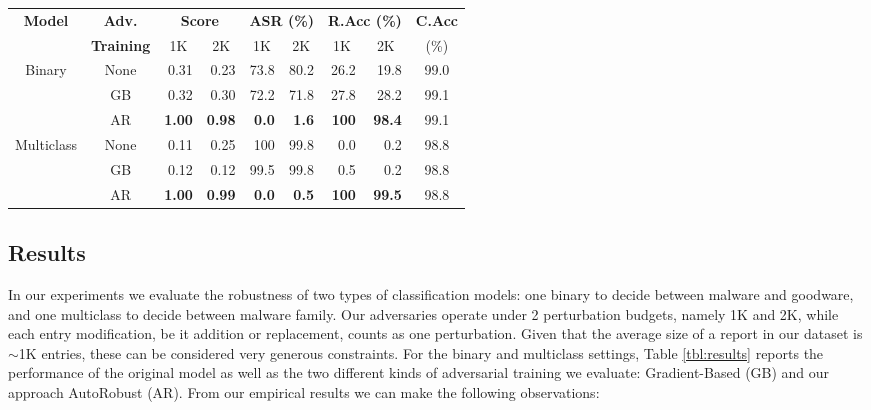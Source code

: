 \begin{table*}[!ht]
    \centering
    \caption{Performance of AutoRobust (AR), gradient-based (GB) adversarial training, and the original vanilla HMIL model considering the two perturbation budgets, 1K and 2K. The metrics displayed are: Score (of the origin class), Attack Success Rate (ASR), Clean Accuracy (C.Acc), and Robust Accuracy (R.Acc), all reported on the same hold-out test set.}
    \begin{tabular}{c|c|r|r|r|r|r|r|c}
    \toprule
    \multirow{2}{*}{\textbf{Model}} & \textbf{\small Adv.} & \multicolumn{2}{c|}{\textbf{Score}} & \multicolumn{2}{c|}{\textbf{ASR (\%)}} & \multicolumn{2}{c|}{\textbf{R.Acc (\%)}} & \textbf{C.Acc} \\
    & \textbf{\small Training} & \multicolumn{1}{c}{1K} & \multicolumn{1}{c|}{2K} & \multicolumn{1}{c}{1K} & \multicolumn{1}{c|}{2K} & \multicolumn{1}{c}{1K} & \multicolumn{1}{c|}{2K} & (\%)\\
    \midrule
    \multirow{3}{*}{Binary} & None & 0.31 & 0.23 & 73.8 & 80.2 & 26.2 & 19.8 & 99.0 \\
    & GB & 0.32 & 0.30 & 72.2 & 71.8 & 27.8 & 28.2 & 99.1 \\
    & AR & \textbf{1.00} & \textbf{0.98} & \textbf{0.0} & \textbf{1.6} & \textbf{100} & \textbf{98.4} & 99.1 \\
    \midrule
    \multirow{3}{*}{Multiclass} & None & 0.11 & 0.25 & 100 & 99.8 & 0.0 & 0.2 & 98.8 \\
    & GB & 0.12 & 0.12 & 99.5 & 99.8 & 0.5 & 0.2 & 98.8 \\
    & AR & \textbf{1.00} & \textbf{0.99} & \textbf{0.0} & \textbf{0.5} & \textbf{100} & \textbf{99.5} & 98.8 \\
    \bottomrule
    \end{tabular}
    \label{tbl:results}
\end{table*}

\subsection{Results}
In our experiments we evaluate the robustness of two types of classification models: one binary to decide between malware and goodware, and one multiclass to decide between malware family.
Our adversaries operate under 2 perturbation budgets, namely 1K and 2K, while each entry modification, be it addition or replacement, counts as one perturbation.
Given that the average size of a report in our dataset is $\sim$1K entries, these can be considered very generous constraints.
For the binary and multiclass settings, Table \ref{tbl:results} reports the performance of the original model as well as the two different kinds of adversarial training we evaluate: Gradient-Based (GB) and our approach AutoRobust (AR).
From our empirical results we can make the following observations:

